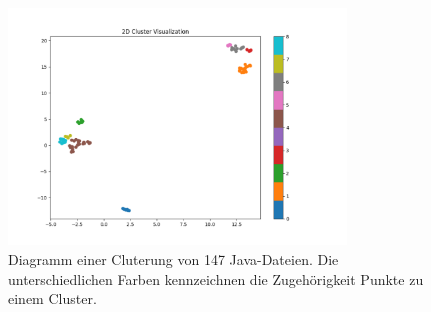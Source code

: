 \begin{figure} %
	\centering
	\includegraphics[width=0.8\textwidth]{images/Erstes Clustering-Diagramm.pdf}
	\caption{Diagramm einer Cluterung von 147 Java-Dateien. Die unterschiedlichen Farben kennzeichnen die Zugehörigkeit Punkte zu einem Cluster.}
	\label{Erstes Clustering-Diagramm}
\end{figure}
